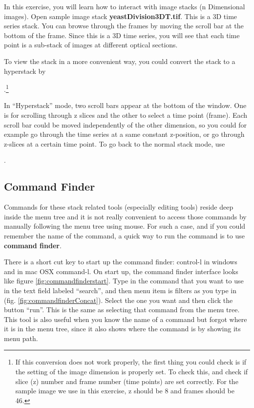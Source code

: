 \begin{indentexercise}{2}
  In this exercise, you will learn how to interact with image stacks (n
  Dimensional images).
  Open sample image stack \textbf{yeastDivision3DT.tif}.
  This is a 3D time series stack. You can browse through the frames by moving
  the scroll bar at the bottom of the frame.
  Since this is a 3D time series, you will see that each time point is a
  sub-stack of images at different optical sections. 
  
  To view the stack in a more
  convenient way, you could convert the stack to a hyperstack by 
  
  .\footnote{If this conversion does not work properly, the first thing you could
  check is if the setting of the image dimension is properly set.
  To check this,  and check if slice (z)
  number and frame number (time points) are set correctly.
  For the sample image we use in this exercise, z should be 8 and frames should
  be 46.}
  
   In ``Hyperstack'' mode, two scroll bars appear at the bottom of the
   window. One is for scrolling through z slices and the other to select a time point (frame).
   Each scroll bar could be moved independently of the other dimension, so you
   could for example go through the time series at a same constant z-position,
   or go through z-slices at a certain time point.
   To go back to the normal stack mode, use 
   
   .
\end{indentexercise}

\subsection{Command Finder}

Commands for these stack related tools (especially editing tools) reside deep inside the menu tree and it is not really convenient to access those commands by manually following the menu tree using mouse. For such a case, and if you could remember the name of the command, a quick way to run the command is to use \textbf{command finder}.

There is a short cut key to start up the command finder: control-l in windows and in mac OSX command-l. On start up, the command finder interface looks like figure \ref{fig:commandfinderstart}. Type in the command that you want to use in the text field labeled ``search'', and then menu item is filters as you type in (fig. \ref{fig:commandfinderConcat}). Select the one you want and then click the button ``run''. This is the same as selecting that command from the menu tree. This tool is also useful when you know the name of a command but forgot where it is in the menu tree, since it also shows where the command is by showing its menu path. 

